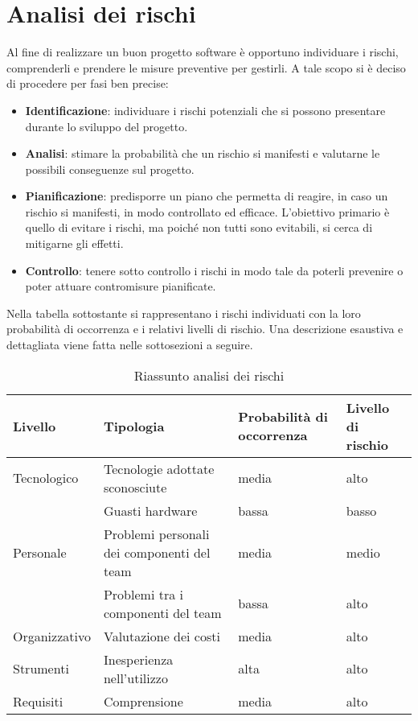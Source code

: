 \section{Analisi dei rischi}
	Al fine di realizzare un buon progetto software è opportuno individuare i rischi, comprenderli e prendere le misure preventive per gestirli. A tale scopo si è deciso di procedere per fasi ben precise:
	\begin{itemize}
		\item \textbf{Identificazione}: individuare i rischi potenziali che si possono presentare durante lo sviluppo del progetto.
		\item \textbf{Analisi}: stimare la probabilità che un rischio si manifesti e valutarne le possibili conseguenze sul progetto.
		\item \textbf{Pianificazione}: predisporre un piano che permetta di reagire, in caso un rischio si manifesti, in modo controllato ed efficace. L'obiettivo primario è quello di evitare i rischi, ma poiché non tutti sono evitabili, si cerca di mitigarne gli effetti.
		\item \textbf{Controllo}: tenere sotto controllo i rischi in modo tale da poterli prevenire o poter attuare contromisure pianificate.
	\end{itemize}
	Nella tabella sottostante si rappresentano i rischi individuati con la loro probabilità di occorrenza e i relativi livelli di rischio.
	Una descrizione esaustiva e dettagliata viene fatta nelle sottosezioni a seguire.
	\begin{table}[H]\centering \tabulinesep=3pt
			\begin{tabu}to \textwidth {|X[4]|X[3c]|X[4]|X[4]|}
				\hline
				Livello 			& Tipologia					& Probabilità di occorrenza 	& Livello di rischio  \\ \hline

				Tecnologico		& Tecnologie adottate sconosciute			& media 					& alto 		 \\ 
				  				& Guasti hardware						& bassa 					& basso 		 \\ \hline
				Personale		 	& Problemi personali dei componenti del team	& media 					& medio 		 \\ 
								& Problemi tra i componenti del team		& bassa 					& alto 		 \\ \hline
				Organizzativo	 	& Valutazione dei costi					& media 					& alto 		 \\ \hline
				Strumenti			& Inesperienza nell'utilizzo				& alta 					& alto 		 \\ \hline
				Requisiti		 	& Comprensione 						& media					& alto 		 \\ \hline
			\end{tabu}
		\caption{Riassunto analisi dei rischi}
	\end{table}
